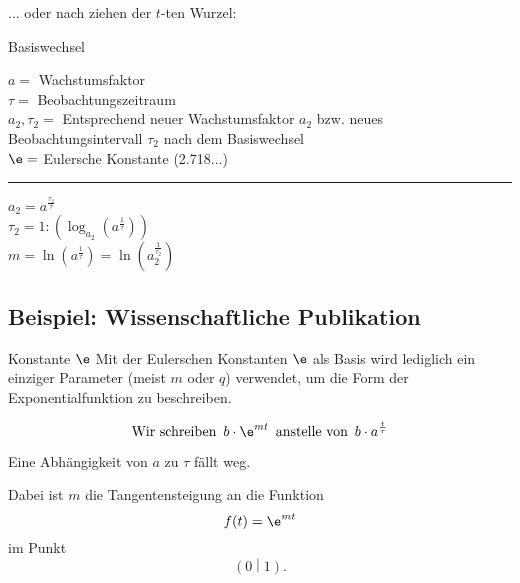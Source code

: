 ... oder nach ziehen der $t$-ten Wurzel:

\begin{gesetz}{Basiswechsel}{}

  \begin{center}\end{center}

 
  $a=$ Wachstumsfaktor\\
  $\tau=$ Beobachtungszeitraum\\
  $a_2, \tau_2=$ Entsprechend neuer Wachstumsfaktor $a_2$ bzw. neues
  Beobachtungsintervall $\tau_2$ nach dem Basiswechsel\\
  $\e=$ Eulersche Konstante (2.718...)\\
  \hrule
  \vspace{3mm}
\begin{center}\end{center}
  \vspace{3mm}
  $a_2 = a^{\frac{\tau_2}{\tau}}$\\
  \vspace{3mm}
  $\tau_2=1 : \left(\log_{a_2}\left(a^\frac1\tau\right)\right)$\\
  \vspace{3mm}
  $m=\ln\left(a^\frac1\tau\right) =  \ln\left(a_2^\frac1{\tau_2}\right)$\\
\end{gesetz}
\newpage

\newpage

\subsection{Beispiel: Wissenschaftliche Publikation}


\begin{bemerkung}{Konstante $\e$}{}
  Mit der Eulerschen Konstanten $\e$ als Basis wird lediglich ein einziger
  Parameter (meist $m$ oder $q$) verwendet, um die Form der
  Exponentialfunktion zu beschreiben.

  $$\text{Wir schreiben }\, b\cdot{}\e^{mt} \,\text{ anstelle von }\, b\cdot{}a^{\frac{t}{\tau}}$$

  Eine Abhängigkeit von $a$ zu $\tau$ fällt weg.

  Dabei ist $m$ die Tangentensteigung an die Funktion $$f(t) = \e^{mt}$$
  im Punkt $$\left(0\middle|1\right).$$
\end{bemerkung}



